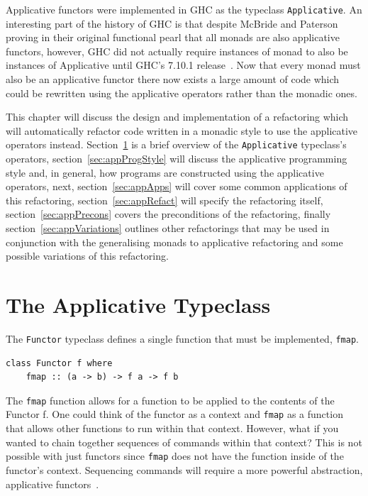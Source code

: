 Applicative functors were implemented in GHC as the typeclass \texttt{Applicative}. An interesting part of the history of GHC is that despite McBride and Paterson proving in their original functional pearl that all monads are also applicative functors, however,  GHC did not actually require instances of monad to also be instances of Applicative until GHC's 7.10.1 release~\citep{ghc7.10Release}. Now that every monad must also be an applicative functor there now exists a large amount of code which could be rewritten using the applicative operators rather than the monadic ones. 

This chapter will discuss the design and implementation of a refactoring which will automatically refactor code written in a monadic style to use the applicative operators instead. Section~\ref{sec:appOverview} is a brief overview of the \texttt{Applicative} typeclass's operators, section~\ref{sec:appProgStyle} will discuss the applicative programming style and, in general, how programs are constructed using the applicative operators, next, section~\ref{sec:appApps} will cover some common applications of this refactoring, section~\ref{sec:appRefact} will specify the refactoring itself, section~\ref{sec:appPrecons} covers the preconditions of the refactoring, finally section~\ref{sec:appVariations} outlines other refactorings that may be used in conjunction with the generalising monads to applicative refactoring and some possible variations of this refactoring. 

\section{The Applicative Typeclass}
\label{sec:appOverview}

The \texttt{Functor} typeclass defines a single function that must be implemented, \texttt{fmap}.

\begin{lstlisting}[frame=tblr]
class Functor f where
	fmap :: (a -> b) -> f a -> f b
\end{lstlisting}

The \texttt{fmap} function allows for a function to be applied to the contents of the Functor f. One could think of the functor as a context and \texttt{fmap} as a function that allows other functions to run within that context. However, what if you wanted to chain together sequences of commands within that context? This is not possible with just functors since \texttt{fmap} does not have the function inside of the functor's context. Sequencing commands will require a more powerful abstraction, applicative functors~\citep{realWorldHaskell}. 

